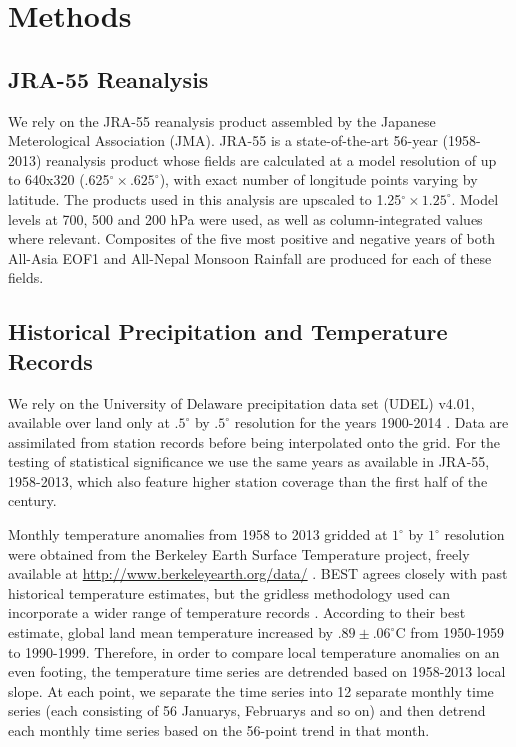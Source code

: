 	
\section{Methods}

\subsection{JRA-55 Reanalysis}

	We rely on the JRA-55 reanalysis product assembled by the Japanese Meterological Association (JMA). JRA-55 is a state-of-the-art 56-year (1958-2013) reanalysis product whose fields are calculated at a model resolution of up to 640x320 (.625$^{\circ} \times .625^{\circ}$), with exact number of longitude points varying by latitude. The products used in this analysis are upscaled to 1.25$^{\circ} \times 1.25^{\circ}$. Model levels at 700, 500 and 200 hPa were used, as well as column-integrated values where relevant. Composites of the five most positive and negative years of both All-Asia EOF1 and All-Nepal Monsoon Rainfall are produced for each of these fields. 
	
	
\subsection{Historical Precipitation and Temperature Records}

	We rely on the University of Delaware precipitation data set (UDEL) v4.01, available over land only at $.5^{\circ}$ by $.5^{\circ}$ resolution for the years 1900-2014 \citep{Matsuura2015}. Data are assimilated from station records before being interpolated onto the grid. For the testing of statistical significance we use the same years as available in JRA-55, 1958-2013, which also feature higher station coverage than the first half of the  century.

	Monthly temperature anomalies from 1958 to 2013 gridded at $1^{\circ}$ by $1^{\circ}$ resolution were obtained from the Berkeley Earth Surface Temperature project, freely available at \url{http://www.berkeleyearth.org/data/} \citep{Rohde2012}. BEST agrees closely with past historical temperature estimates, but the gridless methodology used can incorporate a wider range of temperature records \citep{Rohde2013}. According to their best estimate, global land mean temperature increased by $.89 \pm .06^{\circ}$C from 1950-1959 to 1990-1999. Therefore, in order to compare local temperature anomalies on an even footing, the temperature time series are detrended based on 1958-2013 local slope. At each point, we separate the time series into 12 separate monthly time series (each consisting of 56 Januarys, Februarys and so on) and then detrend each monthly time series based on the 56-point trend in that month.
	
